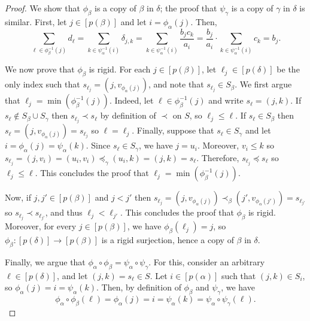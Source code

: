 \documentclass[11pt]{article}
\newcommand{\unif}[1]{\mathsf H_{#1}}
\theoremstyle{remark}
\newtheorem{observation}[theorem]{Observation}
\begin{document}
\begin{proof}
We show that $\phi_{\beta}$ is a copy of $\beta$ in $\delta$; the proof that $\psi_{\gamma}$ is a copy of $\gamma$ in $\delta$ is similar.
First, let $j \in [p(\beta)]$ and let $i = \phi_{\alpha}(j)$. 
Then, \[\sum_{\ell \in \phi_{\beta}^{-1}(j)}d_{\ell} = \sum_{k \in \psi_{\alpha}^{-1}(i)}\delta_{j, k} = \sum_{k \in \psi_{\alpha}^{-1}(i)}\frac{b_j c_k}{a_i} = \frac{b_j}{a_i} \cdot \sum_{k \in \psi_{\alpha}^{-1}(i)}c_k = b_j.\]

We now prove that $\phi_{\beta}$ is rigid.
For each $j \in [p(\beta)]$, let $\ell_j \in [p(\delta)]$ be the only index such that $s_{\ell_j} = (j, v_{\phi_{\alpha}(j)})$, and note that $s_{\ell_j} \in S_{\beta}$.
We first argue that $\ell_j = \min(\phi_{\beta}^{-1}(j))$.
Indeed, let $\ell \in \phi_{\beta}^{-1}(j)$ and write $s_{\ell} = (j, k)$.
If $s_{\ell} \notin S_{\beta} \cup S_{\gamma}$ then $s_{\ell_j} \prec s_{\ell}$ by definition of $\prec$ on $S$, so $\ell_j \leq \ell$.
If $s_{\ell} \in S_{\beta}$ then $s_{\ell} = (j, v_{\phi_{\alpha}(j)}) = s_{\ell_j}$ so $\ell = \ell_j$.
Finally, suppose that $s_{\ell} \in S_{\gamma}$ and let $i = \phi_{\alpha}(j) = \psi_{\alpha}(k)$.
Since $s_{\ell} \in S_{\gamma}$, we have $j = u_i$.
Moreover, $v_i \leq k$ so $s_{\ell_j} = (j, v_i) = (u_i, v_i) \preceq_{\gamma} (u_i, k) = (j, k) = s_{\ell}$.
Therefore, $s_{\ell_j} \preceq s_{\ell}$ so $\ell_j \leq \ell$.
This concludes the proof that $\ell_j = \min(\phi_{\beta}^{-1}(j))$.

Now, if $j, j' \in [p(\beta)]$ and $j < j'$ then $s_{\ell_j} = (j, v_{\phi_{\alpha}(j)}) \prec_{\beta} (j', v_{\phi_{\alpha}(j')}) = s_{\ell_{j'}}$ so $s_{\ell_j} \prec s_{\ell_{j'}}$, and thus $\ell_j < \ell_{j'}$.
This concludes the proof that $\phi_{\beta}$ is rigid.
Moreover, for every $j \in [p(\beta)]$, we have $\phi_{\beta}(\ell_j) = j$, so $\phi_{\beta} : [p(\delta)] \to [p(\beta)]$ is a rigid surjection, hence a copy of $\beta$ in $\delta$.

Finally, we argue that $\phi_{\alpha} \circ \phi_{\beta} = \psi_{\alpha} \circ \psi_{\gamma}$.
For this, consider an arbitrary $\ell \in [p(\delta)]$, and let $(j, k) = s_\ell \in S$. Let $i \in [p(\alpha)]$ such that $(j, k) \in S_i$, so $\phi_{\alpha}(j) = i = \psi_{\alpha}(k)$.
Then, by definition of $\phi_{\beta}$ and $\psi_{\gamma}$, we have \[\phi_{\alpha} \circ \phi_{\beta}(\ell) = \phi_{\alpha}(j) = i = \psi_{\alpha}(k) = \psi_{\alpha} \circ \psi_{\gamma} (\ell).\]
\end{proof}

\end{document}
